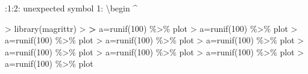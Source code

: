 \documentclass[
]{article}
\newenvironment{Shaded}{\begin{snugshade}}{\end{snugshade}}
\newcommand{\DecValTok}[1]{\textcolor[rgb]{0.00,0.00,0.81}{#1}}
\newcommand{\ErrorTok}[1]{\textcolor[rgb]{0.64,0.00,0.00}{\textbf{#1}}}
\newcommand{\FunctionTok}[1]{\textcolor[rgb]{0.00,0.00,0.00}{#1}}
\newcommand{\NormalTok}[1]{#1}
\newcommand{\OtherTok}[1]{\textcolor[rgb]{0.56,0.35,0.01}{#1}}
\newcommand{\SpecialCharTok}[1]{\textcolor[rgb]{0.00,0.00,0.00}{#1}}
\begin{document}
:1:2: unexpected symbol
1: \textbackslash begin
\^{}

\begin{Shaded}
\begin{Highlighting}[]
\SpecialCharTok{\textgreater{}} \FunctionTok{library}\NormalTok{(magrittr)}
\SpecialCharTok{\textgreater{}} 
\ErrorTok{\textgreater{}}\NormalTok{ a}\OtherTok{=}\FunctionTok{runif}\NormalTok{(}\DecValTok{100}\NormalTok{) }\SpecialCharTok{\%\textgreater{}\%}\NormalTok{ plot}
\SpecialCharTok{\textgreater{}}\NormalTok{ a}\OtherTok{=}\FunctionTok{runif}\NormalTok{(}\DecValTok{100}\NormalTok{) }\SpecialCharTok{\%\textgreater{}\%}\NormalTok{ plot}
\SpecialCharTok{\textgreater{}}\NormalTok{ a}\OtherTok{=}\FunctionTok{runif}\NormalTok{(}\DecValTok{100}\NormalTok{) }\SpecialCharTok{\%\textgreater{}\%}\NormalTok{ plot}
\SpecialCharTok{\textgreater{}}\NormalTok{ a}\OtherTok{=}\FunctionTok{runif}\NormalTok{(}\DecValTok{100}\NormalTok{) }\SpecialCharTok{\%\textgreater{}\%}\NormalTok{ plot}
\SpecialCharTok{\textgreater{}}\NormalTok{ a}\OtherTok{=}\FunctionTok{runif}\NormalTok{(}\DecValTok{100}\NormalTok{) }\SpecialCharTok{\%\textgreater{}\%}\NormalTok{ plot}
\SpecialCharTok{\textgreater{}}\NormalTok{ a}\OtherTok{=}\FunctionTok{runif}\NormalTok{(}\DecValTok{100}\NormalTok{) }\SpecialCharTok{\%\textgreater{}\%}\NormalTok{ plot}
\SpecialCharTok{\textgreater{}}\NormalTok{ a}\OtherTok{=}\FunctionTok{runif}\NormalTok{(}\DecValTok{100}\NormalTok{) }\SpecialCharTok{\%\textgreater{}\%}\NormalTok{ plot}
\SpecialCharTok{\textgreater{}}\NormalTok{ a}\OtherTok{=}\FunctionTok{runif}\NormalTok{(}\DecValTok{100}\NormalTok{) }\SpecialCharTok{\%\textgreater{}\%}\NormalTok{ plot}
\SpecialCharTok{\textgreater{}}\NormalTok{ a}\OtherTok{=}\FunctionTok{runif}\NormalTok{(}\DecValTok{100}\NormalTok{) }\SpecialCharTok{\%\textgreater{}\%}\NormalTok{ plot}
\end{Highlighting}
\end{Shaded}
\end{document}
